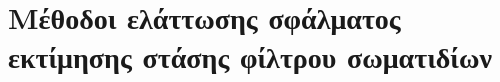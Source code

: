 
\chapter{Μέθοδοι ελάττωσης σφάλματος εκτίμησης στάσης φίλτρου σωματιδίων}
  \label{part:02:chapter:02}
  


